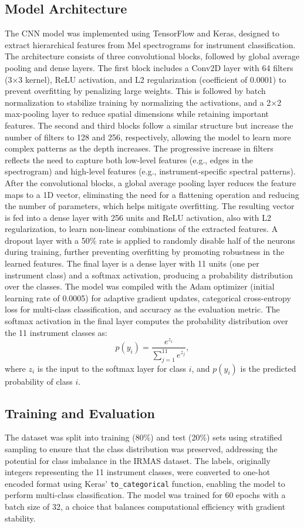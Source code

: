 \documentclass[conference]{IEEEtran}
\begin{document}
\subsection{Model Architecture}
The CNN model was implemented using TensorFlow and Keras, designed to extract hierarchical features from Mel spectrograms for instrument classification. The architecture consists of three convolutional blocks, followed by global average pooling and dense layers. The first block includes a Conv2D layer with 64 filters (3×3 kernel), ReLU activation, and L2 regularization (coefficient of 0.0001) to prevent overfitting by penalizing large weights. This is followed by batch normalization to stabilize training by normalizing the activations, and a 2×2 max-pooling layer to reduce spatial dimensions while retaining important features. The second and third blocks follow a similar structure but increase the number of filters to 128 and 256, respectively, allowing the model to learn more complex patterns as the depth increases. The progressive increase in filters reflects the need to capture both low-level features (e.g., edges in the spectrogram) and high-level features (e.g., instrument-specific spectral patterns).
After the convolutional blocks, a global average pooling layer reduces the feature maps to a 1D vector, eliminating the need for a flattening operation and reducing the number of parameters, which helps mitigate overfitting. The resulting vector is fed into a dense layer with 256 units and ReLU activation, also with L2 regularization, to learn non-linear combinations of the extracted features. A dropout layer with a 50\% rate is applied to randomly disable half of the neurons during training, further preventing overfitting by promoting robustness in the learned features. The final layer is a dense layer with 11 units (one per instrument class) and a softmax activation, producing a probability distribution over the classes. The model was compiled with the Adam optimizer (initial learning rate of 0.0005) for adaptive gradient updates, categorical cross-entropy loss for multi-class classification, and accuracy as the evaluation metric.
The softmax activation in the final layer computes the probability distribution over the 11 instrument classes as:
\begin{equation}
p(y_i) = \frac{e^{z_i}}{\sum_{j=1}^{11} e^{z_j}},
\label{eq:softmax}
\end{equation}
where \( z_i \) is the input to the softmax layer for class \( i \), and \( p(y_i) \) is the predicted probability of class \( i \).
\subsection{Training and Evaluation}
The dataset was split into training (80\%) and test (20\%) sets using stratified sampling to ensure that the class distribution was preserved, addressing the potential for class imbalance in the IRMAS dataset. The labels, originally integers representing the 11 instrument classes, were converted to one-hot encoded format using Keras’ \texttt{to\_categorical} function, enabling the model to perform multi-class classification. The model was trained for 60 epochs with a batch size of 32, a choice that balances computational efficiency with gradient stability.
\end{document}
